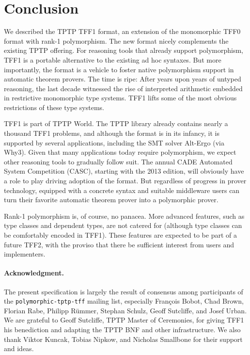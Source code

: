 \section{Conclusion}
\label{sec_concl}

We described the TPTP TFF1 format, an extension of the monomorphic TFF0 format
with rank-1 polymorphism. The new format nicely complements the existing TPTP
offering. %
For reasoning tools that already
support polymorphism, TFF1 is a portable alternative to the existing ad hoc
syntaxes. But more importantly, the format is a vehicle to foster native
polymorphism support in automatic theorem provers. The time is ripe: After years
upon years of untyped reasoning, the last decade witnessed the rise of
interpreted arithmetic embedded in restrictive monomorphic type systems. TFF1
lifts some of the most obvious restrictions of these type systems.

TFF1 is part of TPTP World. The TPTP library already contains
nearly a thousand TFF1 problems, and although the format is in its
infancy, it is supported by several applications, including the SMT solver
Alt-Ergo (via Why3). Given that many applications today require polymorphism, we
expect other reasoning tools to gradually follow suit. The annual CADE Automated
System Competition (CASC), starting with the 2013 edition, will obviously have a
role to play driving adoption of the format. But regardless of progress in
prover technology, equipped with a concrete syntax and suitable middleware users
can turn their favorite automatic theorem prover into a polymorphic prover.

Rank-1 polymorphism is, of course, no panacea. More advanced features, such as
type classes and dependent types, are not catered for (although type
classes can be comfortably encoded in TFF1). These features are expected to be
part of a future TFF2, with the proviso that there be sufficient interest from
users and implementers.

\def\ackname{Acknowledgment}
\paragraph{\textbf{\upshape\ackname.}}
%
The present specification is largely the result of consensus among
participants of the {\tt polymorphic-tptp-tff} mailing list, especially
Fran\c{c}ois Bobot, Chad Brown, Florian Rabe, Philipp R\"ummer, Stephan Schulz,
Geoff Sutcliffe, and Josef Urban.
We are grateful to Geoff Sutcliffe, TPTP Master of Ceremonies, for giving TFF1
his benediction and adapting the TPTP BNF and other infrastructure.
We also thank Viktor Kuncak, Tobias Nipkow, and Nicholas Smallbone for their
support and ideas.
